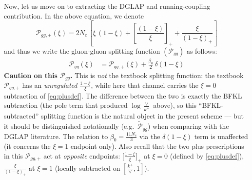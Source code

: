 \documentclass[9pt]{article}
\numberwithin{equation}{section}
\begin{document}
Now, let us move on to extracting the DGLAP and running-coupling contribution. In the above
equation, we denote
$$\mathcal{P}_{gg,+}(\xi) = 2N_{c}\,\left[\xi\,(1-\xi)+\left[\frac{(1-\xi)}{\xi}\right]_{+}+\frac{\xi}{(1-\xi)_{+}}\right]$$
and thus we write the gluon-gluon splitting function $(\mathcal{P}_{gg})$ as follows:
\begin{align}
    \mathcal{P}_{gg}(\xi) & = \mathcal{P}_{gg,+}(\xi) + \frac{\beta_{0}}{2}\, \delta(1-\xi)
\end{align}
{\color{red}\textbf{Caution on this $\mathcal P_{gg}$.} This is \emph{not} the textbook
splitting function: the textbook $\mathcal P_{gg,+}$ has an \emph{unregulated}
$\frac{1-\xi}{\xi}$, while here that channel carries the $\xi=0$ subtraction of
\eqref{eq:plusdef}. The difference between the two is exactly the BFKL subtraction (the pole
term that produced $\log\frac{\vee}{k^{+}}$ above), so this ``BFKL-subtracted'' splitting
function is the natural object in the present scheme --- but it should be distinguished
notationally (e.g.\ $\widetilde{\mathcal P}_{gg}$) when comparing with the DGLAP literature.
The relation to $\beta_{0}=\frac{11N_{c}}{3}$ via the $\delta(1-\xi)$ term is unaffected (it
concerns the $\xi=1$ endpoint only). Also recall that the two plus prescriptions in this
$\mathcal P_{gg,+}$ act at \emph{opposite} endpoints: $\big[\frac{1-\xi}{\xi}\big]_{+}$ at
$\xi=0$ (defined by \eqref{eq:plusdef}), $\frac{\xi}{(1-\xi)_{+}}$ at $\xi=1$ (locally
subtracted on $[\frac{k^{+}}{\vee},1]$).}
\end{document}
